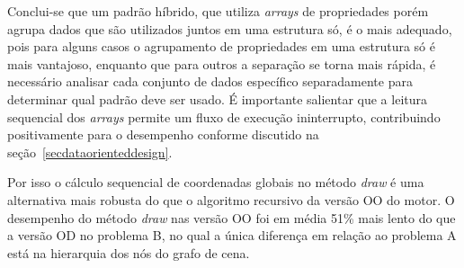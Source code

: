 Conclui-se que um padrão híbrido, que utiliza 
\textit{arrays} de propriedades porém agrupa dados que são 
utilizados juntos em uma estrutura só, é o mais adequado, pois 
para alguns casos o agrupamento de propriedades em uma estrutura 
só é mais vantajoso, enquanto que para outros a separação se torna 
mais rápida, é necessário analisar cada conjunto de dados específico 
separadamente para determinar qual padrão deve ser usado. É 
importante salientar que a leitura sequencial dos \textit{arrays} 
permite um fluxo de execução ininterrupto, contribuindo 
positivamente para o desempenho conforme discutido na 
seção~\ref{secdataorienteddesign}. 

Por isso o cálculo sequencial de coordenadas globais no método 
\textit{draw} é uma alternativa mais robusta do que o algoritmo 
recursivo da versão OO do motor. O desempenho do método 
\textit{draw} nas versão OO foi em média 51\% mais lento do que a 
versão OD no problema B, no qual a única diferença em relação ao 
problema A está na hierarquia dos nós do grafo de cena.
